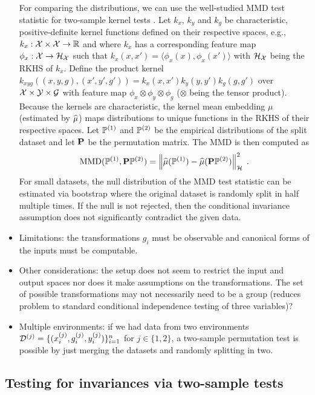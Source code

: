 \begin{itemize}
For comparing the distributions, we can use the well-studied MMD test statistic for two-sample kernel tests \parencite{Gretton:2012}. Let $k_x$, $k_y$ and $k_g$ be characteristic, positive-definite kernel functions defined on their respective spaces, e.g., $k_x:\mathcal{X}\times\mathcal{X}\rightarrow\mathbb{R}$ and where $k_x$ has a corresponding feature map $\phi_x:\mathcal{X}\rightarrow\mathcal{H}_{\mathcal{X}}$ such that $k_x(x,x')=\langle\phi_x(x),\phi_x(x')\rangle$ with $\mathcal{H}_{\mathcal{X}}$ being the RKHS of $k_x$. Define the product kernel $k_{xyg}((x,y,g),(x',y',g'))=k_x(x,x')k_y(y,y')k_g(g,g')$ over $\mathcal{X}\times\mathcal{Y}\times\mathcal{G}$ with feature map $\phi_x\otimes\phi_y\otimes\phi_g$ ($\otimes$ being the tensor product). Because the kernels are characteristic, the kernel mean embedding $\mu$ (estimated by $\widehat{\mu}$) maps distributions to unique functions in the RKHS of their respective spaces. Let $\mathbb{P}^{(1)}$ and $\mathbb{P}^{(2)}$ be the empirical distributions of the split dataset and let $\mathbf{P}$ be the permutation matrix. The MMD is then computed as
\[
\mathrm{MMD}(\mathbb{P}^{(1)},\mathbf{P}\mathbb{P}^{(2)}) = \left\|\widehat{\mu}(\mathbb{P}^{(1)})-\widehat{\mu}(\mathbf{P}\mathbb{P}^{(2)})\right\|_{\mathcal{H}}^2\;.
\]
For small datasets, the null distribution of the MMD test statistic can be estimated via bootstrap where the original dataset is randomly split in half multiple times. If the null is not rejected, then the conditional invariance assumption does not significantly contradict the given data.

\item
Limitations: the transformations $g_i$ must be observable and canonical forms of the inputs must be computable.

\item
Other considerations: the setup does not seem to restrict the input and output spaces nor does it make assumptions on the transformations. The set of possible transformations may not necessarily need to be a group (reduces problem to standard conditional independence testing of three variables)?

\item
Multiple environments: if we had data from two environments $\mathcal{D}^{(j)}=\{(x_i^{(j)},g_i^{(j)},y_i^{(j)})\}_{i=1}^n$ for $j\in\{1,2\}$, a two-sample permutation test is possible by just merging the datasets and randomly splitting in two.

\end{itemize}


\subsection{Testing for invariances via two-sample tests} \label{sec:twosample}

